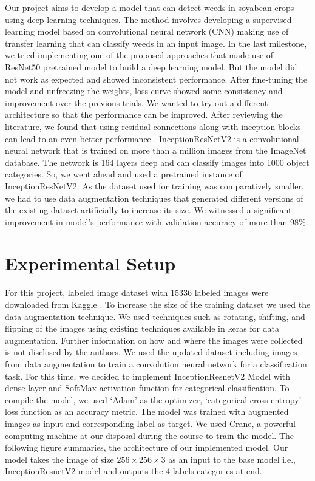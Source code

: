 \documentclass{report}
\begin{document}
Our project aims to develop a model that can detect weeds in soyabean crops using deep learning techniques. The method involves developing a supervised learning model based on convolutional neural network (CNN) making use of transfer learning that can classify weeds in an input image. In the last milestone, we tried implementing one of the proposed approaches that made use of ResNet50 pretrained model to build a deep learning model. But the model did not work as expected and showed inconsistent performance. After fine-tuning the model and unfreezing the weights, loss curve showed some consistency and improvement over the previous trials. We wanted to try out a different architecture so that the performance can be improved. After reviewing the literature, we found that using residual connections along with inception blocks can lead to an even better performance \cite{szegedy2017inception}. InceptionResNetV2 is a convolutional neural network that is trained on more than a million images from the ImageNet database. The network is 164 layers deep and can classify images into 1000 object categories. So, we went ahead and used a pretrained instance of InceptionResNetV2. As the dataset used for training was comparatively smaller, we had to use data augmentation techniques that generated different versions of the existing dataset artificially to increase its size. We witnessed a significant improvement in model’s performance with validation accuracy of more than  98\%.


\section{Experimental Setup}
For this project, labeled image dataset with 15336 labeled images were downloaded from Kaggle \cite{kaggle}. To increase the size of the training dataset we used the data augmentation technique. We used techniques such as rotating, shifting, and flipping of the images using existing techniques available in keras for data augmentation. Further information on how and where the images were collected is not disclosed by the authors. We used the updated dataset including images from data augmentation to train a convolution neural network for a classification task. For this time, we decided to implement InceptionResnetV2 Model with dense layer and SoftMax activation function for categorical classification. To compile the model, we used ‘Adam’ as the optimizer, ‘categorical cross entropy’ loss function as an accuracy metric. The model was trained with augmented images as input and corresponding label as target. We used Crane, a powerful computing machine at our disposal during the course to train the model. The following figure summaries, the architecture of our implemented model. Our model takes the image of size $256\times256\times3$ as an input to the base model i.e., InceptionResnetV2 model and outputs the 4 labels categories at end.  
\label{sec:M3-setup}
\end{document}
